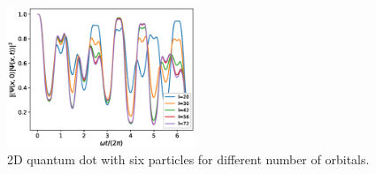 \documentclass[aip,jcp,reprint,floatfix]{revtex4-1}
\begin{document}
        \begin{figure}
            \centering
            \includegraphics[width=0.5\textwidth]{./figures/cc_convergence.eps}
            \caption{2D quantum dot with six particles for different number of
            orbitals.}
            \label{fig:my_label}
        \end{figure}
\end{document}

